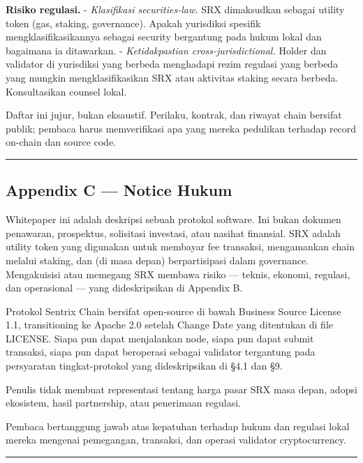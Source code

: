 \documentclass[11pt,a4paper]{article}
\begin{document}
\textbf{Risiko regulasi.}
- \emph{Klasifikasi securities-law.} SRX dimaksudkan sebagai utility token (gas, staking, governance). Apakah yurisdiksi spesifik mengklasifikasikannya sebagai security bergantung pada hukum lokal dan bagaimana ia ditawarkan.
- \emph{Ketidakpastian cross-jurisdictional.} Holder dan validator di yurisdiksi yang berbeda menghadapi rezim regulasi yang berbeda yang mungkin mengklasifikasikan SRX atau aktivitas staking secara berbeda. Konsultasikan counsel lokal.

Daftar ini jujur, bukan eksaustif. Perilaku, kontrak, dan riwayat chain bersifat publik; pembaca harus memverifikasi apa yang mereka pedulikan terhadap record on-chain dan source code.

\begin{center}\rule{0.5\linewidth}{0.5pt}\end{center}

\hypertarget{appendix-c-notice-hukum}{%
\subsection{Appendix C --- Notice Hukum}\label{appendix-c-notice-hukum}}

Whitepaper ini adalah deskripsi sebuah protokol software. Ini bukan dokumen penawaran, prospektus, solisitasi investasi, atau nasihat finansial. SRX adalah utility token yang digunakan untuk membayar fee transaksi, mengamankan chain melalui staking, dan (di masa depan) berpartisipasi dalam governance. Mengakuisisi atau memegang SRX membawa risiko --- teknis, ekonomi, regulasi, dan operasional --- yang dideskripsikan di Appendix B.

Protokol Sentrix Chain bersifat open-source di bawah Business Source License 1.1, transitioning ke Apache 2.0 setelah Change Date yang ditentukan di file LICENSE. Siapa pun dapat menjalankan node, siapa pun dapat submit transaksi, siapa pun dapat beroperasi sebagai validator tergantung pada persyaratan tingkat-protokol yang dideskripsikan di §4.1 dan §9.

Penulis tidak membuat representasi tentang harga pasar SRX masa depan, adopsi ekosistem, hasil partnership, atau penerimaan regulasi.

Pembaca bertanggung jawab atas kepatuhan terhadap hukum dan regulasi lokal mereka mengenai pemegangan, transaksi, dan operasi validator cryptocurrency.

\begin{center}\rule{0.5\linewidth}{0.5pt}\end{center}
\end{document}
